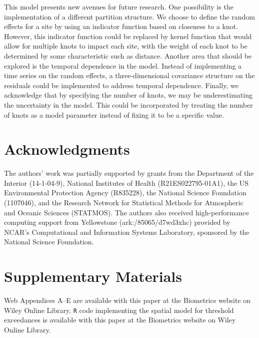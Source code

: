 \documentclass[useAMS,usenatbib,referee]{biom}
\begin{document}
This model presents new avenues for future research.
One possibility is the implementation of a different partition structure.
We choose to define the random effects for a site by using an indicator function based on closeness to a knot.
However, this indicator function could be replaced by kernel function that would allow for multiple knots to impact each site, with the weight of each knot to be determined by some characteristic such as distance.
Another area that should be explored is the temporal dependence in the model.
Instead of implementing a time series on the random effects, a three-dimensional covariance structure on the residuals could be implemented to address temporal dependence.
Finally, we acknowledge that by specifying the number of knots, we may be underestimating the uncertainty in the model.
This could be incorporated by treating the number of knots as a model parameter instead of fixing it to be a specific value.

\backmatter

\section*{Acknowledgments}
The authors' work was partially supported by grants from the Department of the Interior (14-1-04-9), National Institutes of Health (R21ES022795-01A1), the US Environmental Protection Agency (R835228), the National Science Foundation (1107046), and the Research Network for Statistical Methods for Atmospheric and Oceanic Sciences (STATMOS).
The authors also received high-performance computing support from Yellowstone (ark:/85065/d7wd3xhc) provided by NCAR's Computational and Information Systems Laboratory, sponsored by the National Science Foundation.

\section*{Supplementary Materials}
Web Appendices A--E are available with this paper at the Biometrics website on Wiley Online Library.
\texttt{R} code implementing the spatial \skewt model for threshold exceedances is available with this paper at the Biometrics website on Wiley Online Library.\vspace*{-8pt}





\label{stlastpage}
\end{document}
